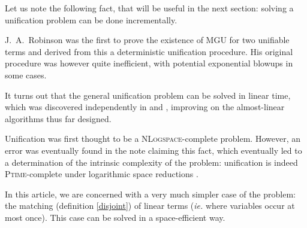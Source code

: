 Let us note the following fact, that will be useful in the next section: solving a unification problem can be done incrementally.

\smallskip
{}





J.~A.~Robinson was the first to prove the existence of MGU for two unifiable terms and derived from this a deterministic unification procedure.
His original procedure was however quite inefficient, with potential exponential blowups in some cases. 

\smallskip
It turns out that the general unification problem can be solved in linear time, which was discovered independently in \cite{paterson_linear_1978} and \cite{martelli_unification_1976}, improving on the almost-linear algorithms thus far designed.

\smallskip
Unification was first thought to be a \textsc{NLogspace}-complete problem. However, an error was eventually found in the note \cite{lewis_unifiability_1982} claiming this fact, which eventually led to a determination of the intrinsic complexity of the problem: unification is indeed \textsc{Ptime}-complete under logarithmic space reductions \cite{dwork_sequential_1984}.

\medskip
In this article, we are concerned with a very much simpler case of the problem: the matching (definition \ref{disjoint}) of linear terms (\textit{ie.} where variables occur at most once).
This case can be solved in a space-efficient way.

